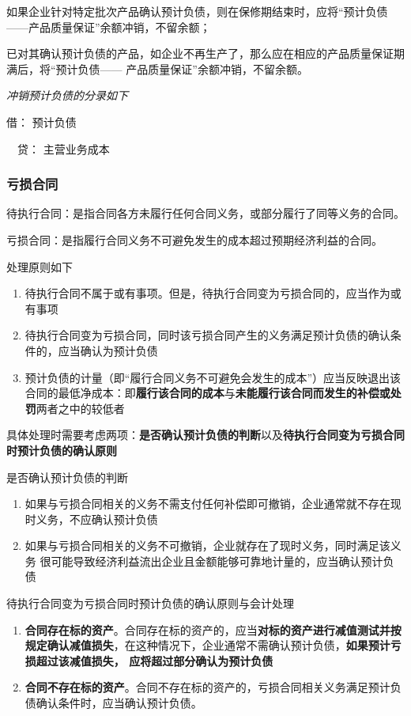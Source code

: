 \documentclass[UTF8,12pt]{ctexart}
\newenvironment{Dr}{\noindent 借：}{\par}
\newenvironment{Cr}{\noindent \ \ 贷：}{\par}
\numberwithin{equation}{section} %
\numberwithin{figure}{section}
\numberwithin{table}{section}
\begin{document}
	如果企业针对特定批次产品确认预计负债，则在保修期结束时，应将“预计负债——产品质量保证”余额冲销，不留余额；
	
	已对其确认预计负债的产品，如企业不再生产了，那么应在相应的产品质量保证期满后，将“预计负债—— 产品质量保证”余额冲销，不留余额。
	
	\textit{冲销预计负债的分录如下}
	
	\begin{Dr}
		预计负债
	\end{Dr}
	\begin{Cr}
		主营业务成本
	\end{Cr}

	
	\subsubsection{亏损合同}
	待执行合同：是指合同各方未履行任何合同义务，或部分履行了同等义务的合同。
	
	亏损合同：是指履行合同义务不可避免发生的成本超过预期经济利益的合同。
	
	处理原则如下
	\begin{enumerate}
		\item 待执行合同不属于或有事项。但是，待执行合同变为亏损合同的，应当作为或有事项
		
		\item 待执行合同变为亏损合同，同时该亏损合同产生的义务满足预计负债的确认条件的，应当确认为预计负债
		
		\item 预计负债的计量（即“履行合同义务不可避免会发生的成本”）应当反映退出该合同的最低净成本：即\textbf{履行该合同的成本}与\textbf{未能履行该合同而发生的补偿或处罚}两者之中的较低者
	\end{enumerate}

	具体处理时需要考虑两项：\textbf{是否确认预计负债的判断}以及\textbf{待执行合同变为亏损合同时预计负债的确认原则}
	
	是否确认预计负债的判断
	\begin{enumerate}
		\item 如果与亏损合同相关的义务不需支付任何补偿即可撤销，企业通常就不存在现时义务，不应确认预计负债
		
		\item 如果与亏损合同相关的义务不可撤销，企业就存在了现时义务，同时满足该义务  很可能导致经济利益流出企业且金额能够可靠地计量的，应当确认预计负债
	\end{enumerate}
	
	待执行合同变为亏损合同时预计负债的确认原则与会计处理
	\begin{enumerate}
		\item \textbf{合同存在标的资产}。合同存在标的资产的，应当\textbf{对标的资产进行减值测试并按规定确认减值损失}，在这种情况下，企业通常不需确认预计负债，\textbf{如果预计亏损超过该减值损失，  应将超过部分确认为预计负债}
		
		\item \textbf{合同不存在标的资产}。合同不存在标的资产的，亏损合同相关义务满足预计负债确认条件时，应当确认预计负债。
	\end{enumerate}
	
\end{document}
